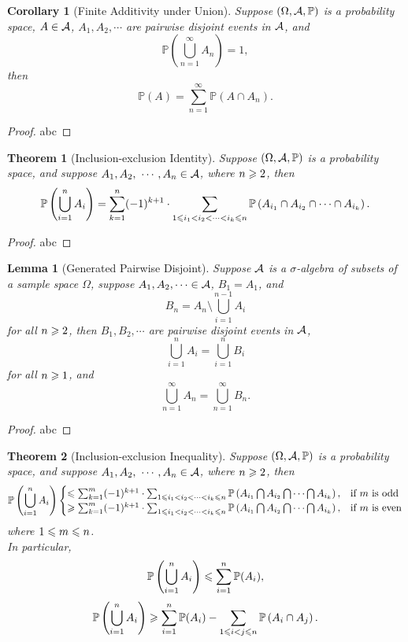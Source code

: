 \documentclass[openany,12pt]{book}
\newtheorem{theorem}{Theorem}[chapter]
\newtheorem{corollary}{Corollary}[chapter]
\newtheorem{lemma}{Lemma}[chapter]
\begin{document}
\begin{corollary}[Finite Additivity under Union]
Suppose $(\Omega,\mathcal{A},\mathbb{P})$ is a probability space, $A\in\mathcal{A}$, $A_1,A_2,\cdots$ are pairwise disjoint events in $\mathcal{A}$, and $$\mathbb{P}\left(\bigcup_{n=1}^\infty A_n \right)=1,$$ then 
$$\mathbb{P}(A)=\sum_{n=1}^\infty \mathbb{P}\left(A\cap A_n \right).$$ 
\end{corollary}

\begin{proof}
  abc
\end{proof}

\begin{theorem}[Inclusion-exclusion Identity]
Suppose $(\Omega,\mathcal{A},\mathbb{P})$ is a probability space, and suppose $A_1,A_2,\ \cdots,A_n\in\ma $, where $n \geqslant2$, then $$\mathbb{P}\left(\bigcup_{i=1}^n A_i \right)=\sum_{k=1}^n(-1)^{k+1}\cdot  \sum_{1\leqslant i_1<i_2<\cdots<i_k\leqslant n}\mathbb{P}\left(A_{i_1} \cap A_{i_2 } \cap\cdots\cap A_{i_k } \right).$$
\end{theorem}

\begin{proof}
  abc
\end{proof}

\begin{lemma}[Generated Pairwise Disjoint]
Suppose $\mathcal{A}$ is a $\sigma$-algebra of subsets of a sample space $\Omega$, suppose $A_1,A_2,\cdots\in\mathcal{A}$, $B_1=A_1$, and $$B_n=A_n\setminus\bigcup_{i=1}^{n-1}A_i$$  for all $n\geqslant2$, then $B_1,B_2,\cdots$ are pairwise disjoint events in $\mathcal{A}$, $$\bigcup_{i=1}^nA_i =\bigcup_{i=1}^nB_i$$  for all $n\geqslant1$, and $$\bigcup_{n=1}^\infty A_n =\bigcup_{n=1}^\infty B_n.$$
\end{lemma}

\begin{proof}
  abc
\end{proof}

\begin{theorem}[Inclusion-exclusion Inequality]
Suppose $(\Omega,\mathcal{A},\mathbb{P})$ is a probability space, and suppose $A_1,A_2,\ \cdots,A_n\in\ma$, where $n\geqslant2$, then
$$\mathbb{P}\left(\bigcup_{i=1}^n A_i \right)
\begin{cases}
\leqslant\sum_{k=1}^m(-1)^{k+1}\cdot  \sum_{1\leqslant i_1<i_2<\cdots<i_k\leqslant n}\mathbb{P}\left(A_{i_1} \bigcap A_{i_2 } \bigcap\cdots\bigcap A_{i_k } \right),& \text{if $m$ is odd}\\
\geqslant\sum_{k=1}^m(-1)^{k+1}\cdot  \sum_{1\leqslant i_1<i_2<\cdots<i_k\leqslant n}\mathbb{P}\left(A_{i_1} \bigcap A_{i_2 } \bigcap\cdots\bigcap A_{i_k } \right),& \text{if $m$ is even}
\end{cases}
$$
where $1\leqslant m\leqslant n$.\\
In particular,
$$\mathbb{P}\left(\bigcup_{i=1}^n A_i \right)\leqslant\sum_{i=1}^{n} \mathbb{P}(A_i),$$
$$\mathbb{P}\left(\bigcup_{i=1}^n A_i \right)\geqslant\sum_{i=1}^{n} \mathbb{P}(A_i)-
\sum_{1\leqslant i<j\leqslant n}\mathbb{P}\left(A_i\cap A_j\right).$$
\end{theorem}
\end{document}
